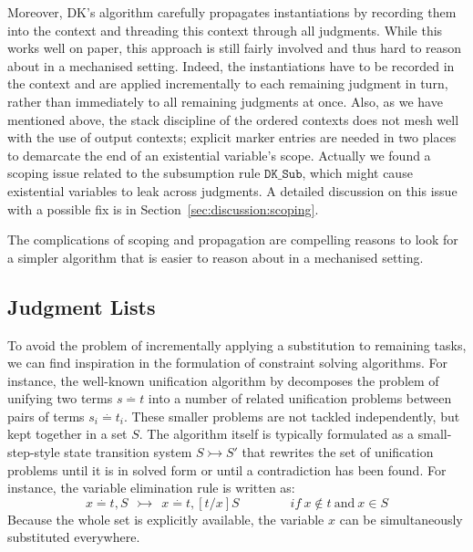 Moreover, DK's algorithm carefully propagates instantiations by recording them
into the context and threading this context through all judgments. 
While this works well on paper, this approach is still fairly involved and thus
hard to reason about in a mechanised setting. Indeed, the instantiations have
to be recorded in the context and are applied incrementally to each remaining
judgment in turn, rather than immediately to all remaining judgments at once.
Also, as we have mentioned above, the stack discipline of the ordered contexts
does not mesh well with the use of output contexts; explicit marker entries are
needed in two places to demarcate the end of an existential variable's scope.
Actually we found a scoping issue related to the subsumption rule $\mathtt{DK\_Sub}$,
which might cause existential variables to leak across judgments.
A detailed discussion on this issue with a possible fix is in Section~\ref{sec:discussion:scoping}.

The complications of scoping and propagation are compelling reasons
to look for a simpler algorithm that is easier to
reason about in a mechanised setting.


\subsection{Judgment Lists}\label{sec:overview:list}

To avoid the problem of incrementally applying a substitution to remaining
tasks, we can find inspiration in the formulation of constraint solving
algorithms. For instance, the well-known unification
algorithm by \citet{unification} decomposes the problem of unifying two terms $s \stackrel{.}{=} t$ into a number
of related unification problems between pairs of terms $s_i \stackrel{.}{=} t_i$. These smaller
problems are not tackled independently, but kept together in a set $S$. 
The algorithm itself is typically formulated as a small-step-style state
transition system $S \rightarrowtail S'$ that rewrites the set of unification
problems until it is in solved form or until a contradiction has been found.
For instance, the variable elimination rule is written as:
\[
   x \stackrel{.}{=} t, S  ~~\rightarrowtail~~  x \stackrel{.}{=} t, [t/x]S   \qquad\qquad{if}~x \not\in t~\text{and}~{x \in S}
\]
Because the whole set is explicitly available, the variable $x$ can be
simultaneously substituted everywhere.


